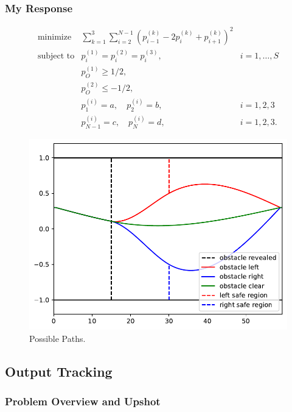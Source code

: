 \documentclass[12pt,reqno]{article}
\theoremstyle{definition}
\numberwithin{equation}{section}
\begin{document}
\subsubsection*{My Response}

\[\begin{array}{lll}
\text{minimize} \; & \sum_{k=1}^3 \sum_{i=2}^{N-1}\left(p_{i-1}^{(k)}-2 p_i^{(k)}+p_{i+1}^{(k)}\right)^2 & \\
\text{subject to} & p_{i}^{(1)} = p_{i}^{(2)} = p_{i}^{(3)}, & i = 1, \ldots, S \\
& p_{O}^{(1)} \ge 1/2, & \\
& p_{O}^{(2)} \le -1/2, & \\
& p^{(i)}_{1} = a, \quad p^{(i)}_{2} = b, & i = 1, 2, 3 \\
& p^{(i)}_{N-1} = c, \quad p^{(i)}_{N} = d, & i = 1, 2, 3.
\end{array}\]


\begin{figure}[htbp]
    \centering
    \includegraphics[width=\linewidth]{../examples/364a/path_plan_cont.pdf}
    \caption{Possible Paths.}
    \label{fig:path_plan}
\end{figure}

\subsection{Output Tracking}

\subsubsection*{Problem Overview and Upshot}
\end{document}
